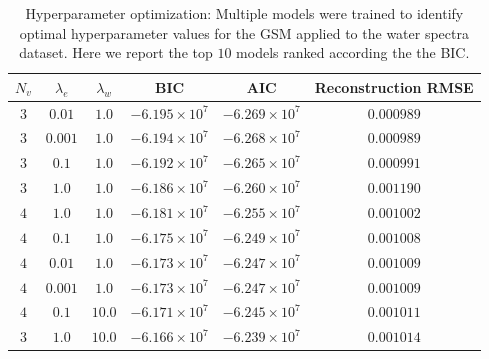 \documentclass[remotesensing,article,submit,pdftex,moreauthors]{Definitions/mdpi}
\begin{document}
\begin{table}[H] 
\caption{Hyperparameter optimization: Multiple models were trained to identify optimal hyperparameter values for the GSM applied to the water spectra dataset. Here we report the top $10$ models ranked according the the BIC.}
\label{table:fit-comparison}
\begin{tabularx}{\textwidth}{CCCCCC}
\toprule
\textbf{$N_v$}	& \textbf{$\lambda_e$}	& \textbf{$\lambda_w$} & \textbf{BIC} & \textbf{AIC} & \textbf{Reconstruction RMSE}\\
\midrule
$3$ & $0.01$    & $1.0$     & $-6.195\times10^7$   & $-6.269\times10^7$   & $0.000989$ \\
$3$	& $0.001$   & $1.0$     & $-6.194\times10^7$   & $-6.268\times10^7$   & $0.000989$ \\
$3$	& $0.1$     & $1.0$	    & $-6.192\times10^7$   & $-6.265\times10^7$   & $0.000991$ \\
$3$	& $1.0$     & $1.0$	    & $-6.186\times10^7$   & $-6.260\times10^7$   & $0.001190$ \\
$4$	& $1.0$     & $1.0$	    & $-6.181\times10^7$   & $-6.255\times10^7$   & $0.001002$ \\
$4$	& $0.1$     & $1.0$	    & $-6.175\times10^7$   & $-6.249\times10^7$   & $0.001008$ \\
$4$	& $0.01$    & $1.0$     & $-6.173\times10^7$   & $-6.247\times10^7$   & $0.001009$ \\ 
$4$	& $0.001$   & $1.0$     & $-6.173\times10^7$   & $-6.247\times10^7$   & $0.001009$ \\
$4$	& $0.1$     & $10.0$    & $-6.171\times10^7$   & $-6.245\times10^7$   & $0.001011$ \\
$3$	& $1.0$     & $10.0$    & $-6.166\times10^7$   & $-6.239\times10^7$   & $0.001014$ \\
\bottomrule
\end{tabularx}
\end{table}
\end{document}
